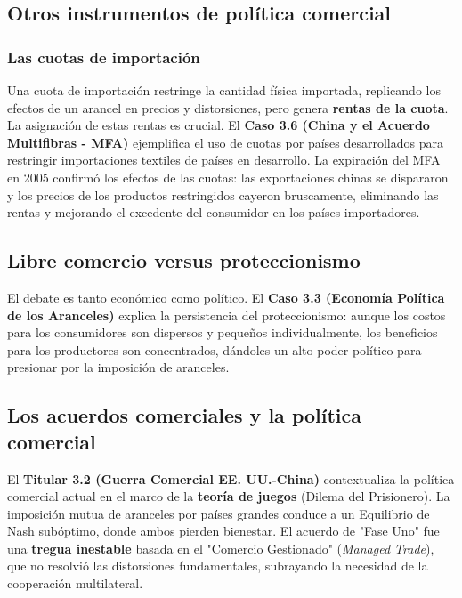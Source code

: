 \subsection{Otros instrumentos de política comercial}
\subsubsection{Las cuotas de importación}
Una cuota de importación restringe la cantidad física importada, replicando los efectos de un arancel en precios y distorsiones, pero genera \textbf{rentas de la cuota}. La asignación de estas rentas es crucial. El \textbf{Caso 3.6 (China y el Acuerdo Multifibras - MFA)} ejemplifica el uso de cuotas por países desarrollados para restringir importaciones textiles de países en desarrollo. La expiración del MFA en 2005 confirmó los efectos de las cuotas: las exportaciones chinas se dispararon y los precios de los productos restringidos cayeron bruscamente, eliminando las rentas y mejorando el excedente del consumidor en los países importadores.

\subsection{Libre comercio versus proteccionismo}
El debate es tanto económico como político. El \textbf{Caso 3.3 (Economía Política de los Aranceles)} explica la persistencia del proteccionismo: aunque los costos para los consumidores son dispersos y pequeños individualmente, los beneficios para los productores son concentrados, dándoles un alto poder político para presionar por la imposición de aranceles.

\subsection{Los acuerdos comerciales y la política comercial}
El \textbf{Titular 3.2 (Guerra Comercial EE. UU.-China)} contextualiza la política comercial actual en el marco de la \textbf{teoría de juegos} (Dilema del Prisionero). La imposición mutua de aranceles por países grandes conduce a un Equilibrio de Nash subóptimo, donde ambos pierden bienestar. El acuerdo de "Fase Uno" fue una \textbf{tregua inestable} basada en el "Comercio Gestionado" (\textit{Managed Trade}), que no resolvió las distorsiones fundamentales, subrayando la necesidad de la cooperación multilateral.

